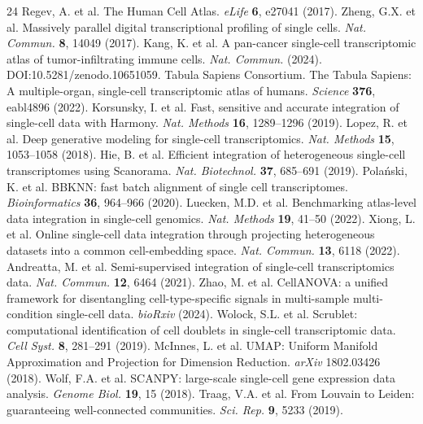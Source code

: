 \documentclass[10pt]{article}
\begin{document}
\begin{thebibliography}{24}
 Regev, A. et al. The Human Cell Atlas. \textit{eLife} \textbf{6}, e27041 (2017).
 Zheng, G.X. et al. Massively parallel digital transcriptional profiling of single cells. \textit{Nat. Commun.} \textbf{8}, 14049 (2017).
 Kang, K. et al. A pan-cancer single-cell transcriptomic atlas of tumor-infiltrating immune cells. \textit{Nat. Commun.} (2024). DOI:10.5281/zenodo.10651059.
 Tabula Sapiens Consortium. The Tabula Sapiens: A multiple-organ, single-cell transcriptomic atlas of humans. \textit{Science} \textbf{376}, eabl4896 (2022).
 Korsunsky, I. et al. Fast, sensitive and accurate integration of single-cell data with Harmony. \textit{Nat. Methods} \textbf{16}, 1289--1296 (2019).
 Lopez, R. et al. Deep generative modeling for single-cell transcriptomics. \textit{Nat. Methods} \textbf{15}, 1053--1058 (2018).
 Hie, B. et al. Efficient integration of heterogeneous single-cell transcriptomes using Scanorama. \textit{Nat. Biotechnol.} \textbf{37}, 685--691 (2019).
 Pola\'{n}ski, K. et al. BBKNN: fast batch alignment of single cell transcriptomes. \textit{Bioinformatics} \textbf{36}, 964--966 (2020).
 Luecken, M.D. et al. Benchmarking atlas-level data integration in single-cell genomics. \textit{Nat. Methods} \textbf{19}, 41--50 (2022).
 Xiong, L. et al. Online single-cell data integration through projecting heterogeneous datasets into a common cell-embedding space. \textit{Nat. Commun.} \textbf{13}, 6118 (2022).
 Andreatta, M. et al. Semi-supervised integration of single-cell transcriptomics data. \textit{Nat. Commun.} \textbf{12}, 6464 (2021).
 Zhao, M. et al. CellANOVA: a unified framework for disentangling cell-type-specific signals in multi-sample multi-condition single-cell data. \textit{bioRxiv} (2024).
 Wolock, S.L. et al. Scrublet: computational identification of cell doublets in single-cell transcriptomic data. \textit{Cell Syst.} \textbf{8}, 281--291 (2019).
 McInnes, L. et al. UMAP: Uniform Manifold Approximation and Projection for Dimension Reduction. \textit{arXiv} 1802.03426 (2018).
 Wolf, F.A. et al. SCANPY: large-scale single-cell gene expression data analysis. \textit{Genome Biol.} \textbf{19}, 15 (2018).
 Traag, V.A. et al. From Louvain to Leiden: guaranteeing well-connected communities. \textit{Sci. Rep.} \textbf{9}, 5233 (2019).

\end{thebibliography}
\end{document}
